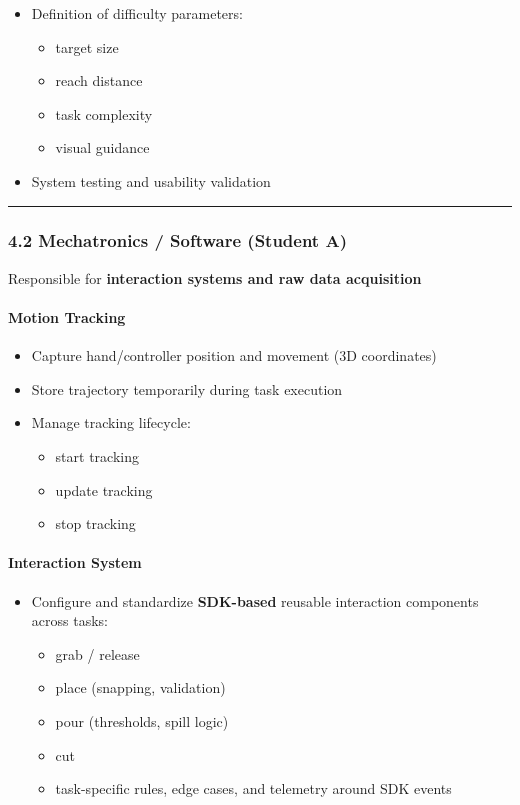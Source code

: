 \documentclass[11pt]{article}
\begin{document}
\begin{itemize}
\item Definition of difficulty parameters:
\begin{itemize}
\item target size
\item reach distance
\item task complexity
\item visual guidance
\end{itemize}
\end{itemize}

\begin{itemize}
\item System testing and usability validation
\end{itemize}

\hrule


\subsubsection*{4.2 Mechatronics / Software (Student A)}


Responsible for \textbf{interaction systems and raw data acquisition}


\paragraph*{Motion Tracking}

\begin{itemize}
\item Capture hand/controller position and movement (3D coordinates)
\item Store trajectory temporarily during task execution
\item Manage tracking lifecycle:
\begin{itemize}
\item start tracking
\item update tracking
\item stop tracking
\end{itemize}
\end{itemize}

\paragraph*{Interaction System}

\begin{itemize}
\item Configure and standardize \textbf{SDK-based} reusable interaction components across tasks:
\begin{itemize}
\item grab / release
\item place (snapping, validation)
\item pour (thresholds, spill logic)
\item cut
\item task-specific rules, edge cases, and telemetry around SDK events
\end{itemize}
\end{itemize}
\end{document}
